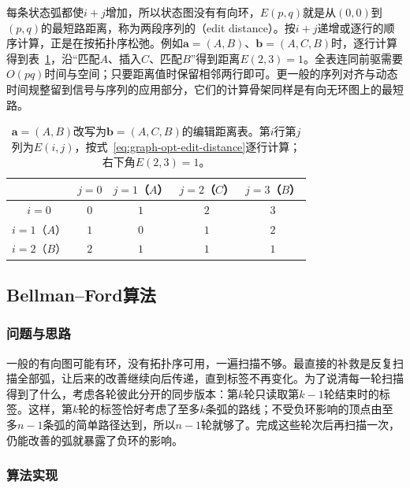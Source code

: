 每条状态弧都使$i+j$增加，所以状态图没有有向环，$E(p,q)$就是从$(0,0)$到$(p,q)$的最短路距离，称为两段序列的（edit distance）。按$i+j$递增或逐行的顺序计算，正是在按拓扑序松弛。例如$\bm a=(A,B)$、$\bm b=(A,C,B)$时，逐行计算得到表~\ref{tab:graph-opt-edit-distance}，沿“匹配$A$、插入$C$、匹配$B$”得到距离$E(2,3)=1$。全表连同前驱需要$O(pq)$时间与空间；只要距离值时保留相邻两行即可。更一般的序列对齐与动态时间规整留到信号与序列的应用部分，它们的计算骨架同样是有向无环图上的最短路。

\begin{table}[!htb]
  \centering
  \caption{$\bm a=(A,B)$改写为$\bm b=(A,C,B)$的编辑距离表。第$i$行第$j$列为$E(i,j)$，按式~\eqref{eq:graph-opt-edit-distance}逐行计算；右下角$E(2,3)=1$。}
  \label{tab:graph-opt-edit-distance}
  \begin{tabular}{@{}ccccc@{}}
    \toprule
    & $j=0$ & $j=1$（$A$） & $j=2$（$C$） & $j=3$（$B$） \\
    \midrule
    $i=0$ & $0$ & $1$ & $2$ & $3$ \\
    $i=1$（$A$） & $1$ & $0$ & $1$ & $2$ \\
    $i=2$（$B$） & $2$ & $1$ & $1$ & $1$ \\
    \bottomrule
  \end{tabular}
\end{table}

\subsection{Bellman--Ford算法}
\label{sec:graph-opt-bellman-ford}

\subsubsection{问题与思路}

一般的有向图可能有环，没有拓扑序可用，一遍扫描不够。最直接的补救是反复扫描全部弧，让后来的改善继续向后传递，直到标签不再变化。为了说清每一轮扫描得到了什么，考虑各轮彼此分开的同步版本：第$k$轮只读取第$k-1$轮结束时的标签。这样，第$k$轮的标签恰好考虑了至多$k$条弧的路线；不受负环影响的顶点由至多$n-1$条弧的简单路径达到，所以$n-1$轮就够了。完成这些轮次后再扫描一次，仍能改善的弧就暴露了负环的影响。

\subsubsection{算法实现}

